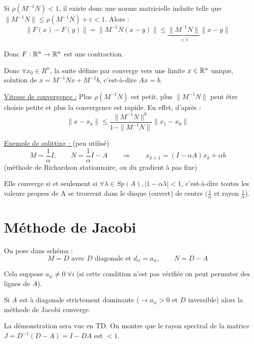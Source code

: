 Si $\rho (M^{-1}N) < 1$, il existe donc une norme matricielle induite telle que $\| M ^{-1} N \| \leq \rho (M^{-1} N) + \varepsilon < 1$. Alors :
\[
    \| F(x) - F(y) \| = \| M^{-1} N (x-y) \| \leq \underbrace{\| M^{^-1}N \|}_{< 1} \| x-y \|
\]

Donc $F : \mathbb{R}^n \rightarrow \mathbb{R}^n$ est une contraction.

Donc $\forall x_0 \in R^n$, la suite définie par  converge vers une limite $x \in \mathbb{R}^n$ unique, solution de $x = M^{-1}Nx+M^{-1}b$, c'est-à-dire $Ax=b$.

\vspace{1cm}
\underline{Vitesse de convergence :} Plus $\rho(M^{-1}N)$ est petit, plus $\|M^{-1}N\|$ peut être choisie petite et plus la convergence est rapide.
En effet, d'après  :
\[
    \|x-x_k\| \leq \frac{\|M^{-1}N\|^k}{1-\|M^{-1}N\|}\|x_1-x_0\|
\]

\vspace{1cm}
\underline{Exemple de splitting : } (peu utilisé)
\[
    M = \frac{1}{\alpha}I, \qquad N = \frac{1}{\alpha}I - A \qquad \Longrightarrow \qquad x_{k+1} = (I - \alpha A)x_k + \alpha b
\]
(méthode de Richardson stationnaire, ou du gradient à pas fixe)

Elle converge si et seulement si $\forall \lambda \in Sp(A), |1-\alpha \lambda | < 1$, c'est-à-dire toutes les valeurs propres de A se trouvent dans le disque (ouvert) de centre $(\frac{1}{\alpha}$ et rayon $\frac{1}{\alpha}$).

\section{Méthode de Jacobi}
On pose dans schéma  :
\[
    M = D \mbox{ avec $D$ diagonale et } d_{ii}=a_{ii}, \qquad N=D-A
\]

\begin{remark}
    Cela suppose $a_{ii} \ne 0 \; \forall i$ (si cette condition n'est pas vérifiée on peut permuter des lignes de $A$).
\end{remark}

\begin{ftheo}
    Si $A$ est à diagonale strictement dominante ($\rightarrow a_{ii}>0$ et $D$ inversible) alors la méthode de Jacobi converge.
\end{ftheo}

La démonstration sera vue en TD. On montre que le rayon spectral de la matrice $J = D^{-1}(D-A) = I - DA$ est $< 1$.


